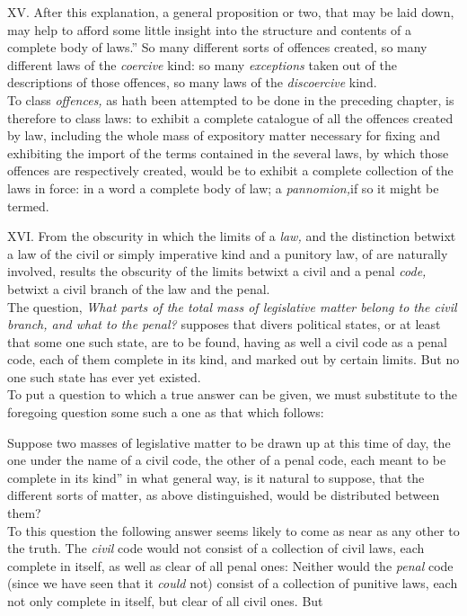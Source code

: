 \documentclass[12pt]{report}
\begin{document}
XV. After this explanation, a general proposition or two, that may be
laid down, may help to afford some little insight into the structure and
contents of a complete body of laws.'' So many different sorts
of offences created, so many different laws of the \emph{coercive} kind:
so many \emph{exceptions} taken out of the descriptions of those
offences, so many laws of the \emph{discoercive} kind.\\
To class \emph{offences,} as hath been attempted to be done in the
preceding chapter, is therefore to class laws: to exhibit a complete
catalogue of all the offences created by law, including the whole mass
of expository matter necessary for fixing and exhibiting the import of
the terms contained in the several laws, by which those offences are
respectively created, would be to exhibit a complete collection of the
laws in force: in a word a complete body of law; a \emph{pannomion,}if
so it might be termed.

XVI. From the obscurity in which the limits of a \emph{law,} and the
distinction betwixt a law of the civil or simply imperative kind and a
punitory law, of are naturally involved, results the obscurity of the
limits betwixt a civil and a penal \emph{code,} betwixt a civil branch
of the law and the penal.\\
The question, \emph{What parts of the total mass of legislative matter
belong to the civil branch, and what to the penal?} supposes that divers
political states, or at least that some one such state, are to be found,
having as well a civil code as a penal code, each of them complete in
its kind, and marked out by certain limits. But no one such state has
ever yet existed.\\
To put a question to which a true answer can be given, we must
substitute to the foregoing question some such a one as that which
follows:

Suppose two masses of legislative matter to be drawn up at this time of
day, the one under the name of a civil code, the other of a penal code,
each meant to be complete in its kind'' in what general way, is
it natural to suppose, that the different sorts of matter, as above
distinguished, would be distributed between them?\\
To this question the following answer seems likely to come as near as
any other to the truth. The \emph{civil} code would not consist of a
collection of civil laws, each complete in itself, as well as clear of
all penal ones: Neither would the \emph{penal} code (since we have seen
that it \emph{could} not) consist of a collection of punitive laws, each
not only complete in itself, but clear of all civil ones. But
\end{document}
